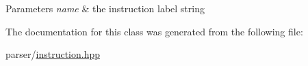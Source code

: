 \begin{DoxyParams}{Parameters}
{\em name} & the instruction label string \\
\hline
\end{DoxyParams}


The documentation for this class was generated from the following file\+:\begin{DoxyCompactItemize}
\item 
parser/\hyperlink{instruction_8hpp}{instruction.\+hpp}\end{DoxyCompactItemize}
